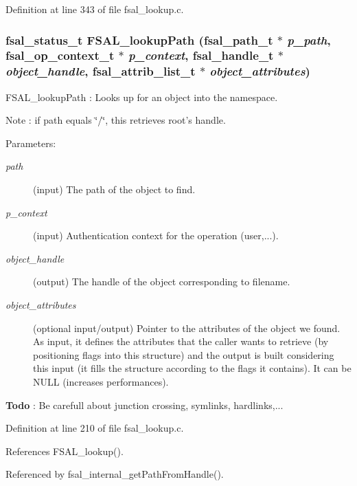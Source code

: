 Definition at line 343 of file fsal\_\-lookup.c.
\subsubsection[{FSAL\_\-lookupPath}]{\setlength{\rightskip}{0pt plus 5cm}fsal\_\-status\_\-t FSAL\_\-lookupPath (fsal\_\-path\_\-t $\ast$ {\em p\_\-path}, \/  fsal\_\-op\_\-context\_\-t $\ast$ {\em p\_\-context}, \/  fsal\_\-handle\_\-t $\ast$ {\em object\_\-handle}, \/  fsal\_\-attrib\_\-list\_\-t $\ast$ {\em object\_\-attributes})}\label{fsal__lookup_8c_b1e4dac2bd55519471bdf10957ff389f}


FSAL\_\-lookupPath : Looks up for an object into the namespace.

Note : if path equals \char`\"{}/\char`\"{}, this retrieves root's handle.

\begin{Desc}
\item[Parameters:]
\begin{description}
\item[{\em path}](input) The path of the object to find. \item[{\em p\_\-context}](input) Authentication context for the operation (user,...). \item[{\em object\_\-handle}](output) The handle of the object corresponding to filename. \item[{\em object\_\-attributes}](optional input/output) Pointer to the attributes of the object we found. As input, it defines the attributes that the caller wants to retrieve (by positioning flags into this structure) and the output is built considering this input (it fills the structure according to the flags it contains). It can be NULL (increases performances). \end{description}
\end{Desc}


\begin{Desc}
\item[{\bf Todo}]: Be carefull about junction crossing, symlinks, hardlinks,... \end{Desc}


Definition at line 210 of file fsal\_\-lookup.c.

References FSAL\_\-lookup().

Referenced by fsal\_\-internal\_\-getPathFromHandle().